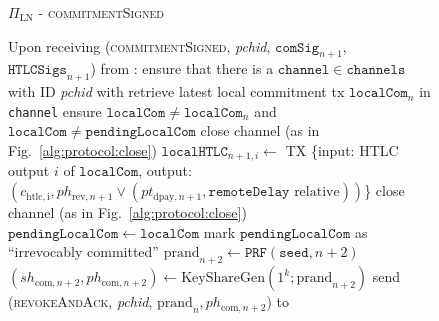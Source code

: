   \begin{figure}[H]
    \begin{protocolbox}{$\Pi_{\mathrm{LN}}$ - \textsc{commitmentSigned}}
      \begin{algorithmic}[1]
        \State Upon receiving (\textsc{commitmentSigned}, \textit{pchid},
        $\mathtt{comSig}_{n+1}$, $\mathtt{HTLCSigs}_{n+1}$) from \bob:
        \Indent
          \State ensure that there is a $\mathtt{channel} \in \mathtt{channels}$
          with ID \textit{pchid} with \bob
          \State retrieve latest local commitment tx $\mathtt{localCom}_n$ in
          \texttt{channel}
          \State ensure $\mathtt{localCom} \neq \mathtt{localCom}_n$ and
          $\mathtt{localCom} \neq \mathtt{pendingLocalCom}$
            \State close channel (as in Fig.~\ref{alg:protocol:close})
            \State \Return
          \EndIf
            \State $\mathtt{localHTLC}_{n+1, i} \gets$ TX \{input: HTLC output
            $i$ of $\mathtt{localCom}$, output: $\left(c_{\mathrm{htlc, i}},
            ph_{\mathrm{rev}, n+1} \vee \left(pt_{\mathrm{dpay}, n+1},
            \mathtt{remoteDelay} \text{ relative}\right)\right)$\}
              \State close channel (as in Fig.~\ref{alg:protocol:close})
              \State \Return
            \EndIf
          \EndFor
          \State $\mathtt{pendingLocalCom} \gets \mathtt{localCom}$
          \State mark $\mathtt{pendingLocalCom}$ as ``irrevocably committed''
          \State $\mathrm{prand}_{n+2} \gets \texttt{PRF}\left(\mathtt{seed},
          n+2\right)$
          \State $\left(sh_{\mathrm{com}, n+2}, ph_{\mathrm{com}, n+2}\right)
          \gets \mathrm{KeyShareGen}\left(1^k; \mathrm{prand}_{n+2}\right)$
          \State send (\textsc{revokeAndAck}, \textit{pchid}, $\mathrm{prand}_n,
          ph_{\mathrm{com}, n+2}$) to \bob
        \EndIndent
      \end{algorithmic}
    \end{protocolbox}
    \caption{}
    \label{alg:protocol:pay:commitmentSigned}
  \end{figure}

